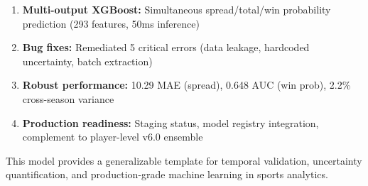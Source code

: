 \begin{enumerate}[itemsep=2pt,parsep=0pt]
    \item \textbf{Multi-output XGBoost:} Simultaneous spread/total/win probability prediction (293 features, 50ms inference)
    \item \textbf{Bug fixes:} Remediated 5 critical errors (data leakage, hardcoded uncertainty, batch extraction)
    \item \textbf{Robust performance:} 10.29 MAE (spread), 0.648 AUC (win prob), 2.2\% cross-season variance
    \item \textbf{Production readiness:} Staging status, model registry integration, complement to player-level v6.0 ensemble
\end{enumerate}

This model provides a generalizable template for temporal validation, uncertainty quantification, and production-grade machine learning in sports analytics.
